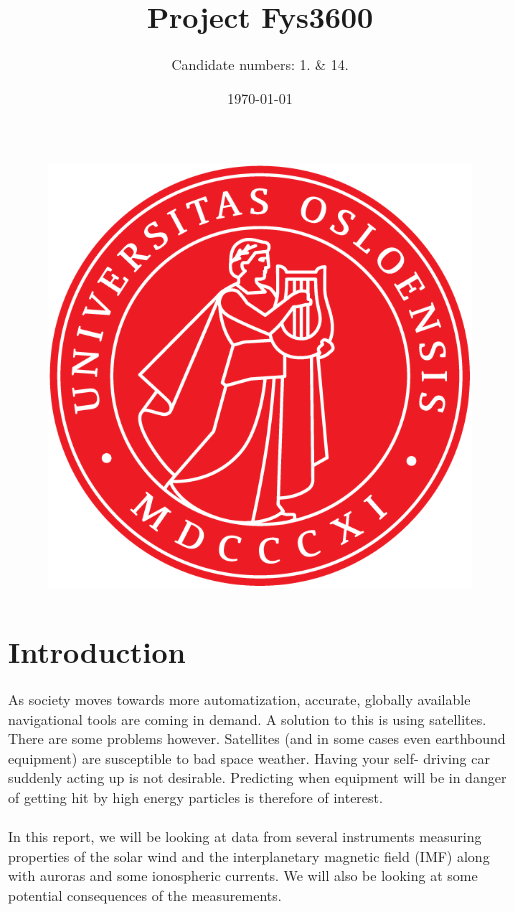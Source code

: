 \documentclass[norsk,a4paper,12pt]{article}
\title{Project Fys3600}
\author{Candidate numbers: 1. \& 14.}
\date{\today}
\begin{document}
\maketitle

\begin{figure}[H]
	\begin{center}
		\includegraphics[scale=1.0]{Figures/uiosegl.png}
	\end{center}
\end{figure}



\newpage

\tableofcontents

\section{Introduction} %
\label{sec:intro}
	As society moves towards more automatization, accurate, globally available navigational tools are coming in demand. A solution to this is using satellites. 			There are some problems however. Satellites (and in some cases even earthbound equipment) are susceptible to bad space weather. Having your self-			driving car suddenly acting up is not desirable. Predicting when equipment will be in danger of getting hit by high energy particles is therefore of interest.\\ 
	\\
	In this report, we will be looking at data from several instruments measuring properties of the solar wind and the interplanetary magnetic field (IMF) along 			with auroras and some ionospheric currents.  We will also be looking at some potential consequences of the measurements.
\end{document}
